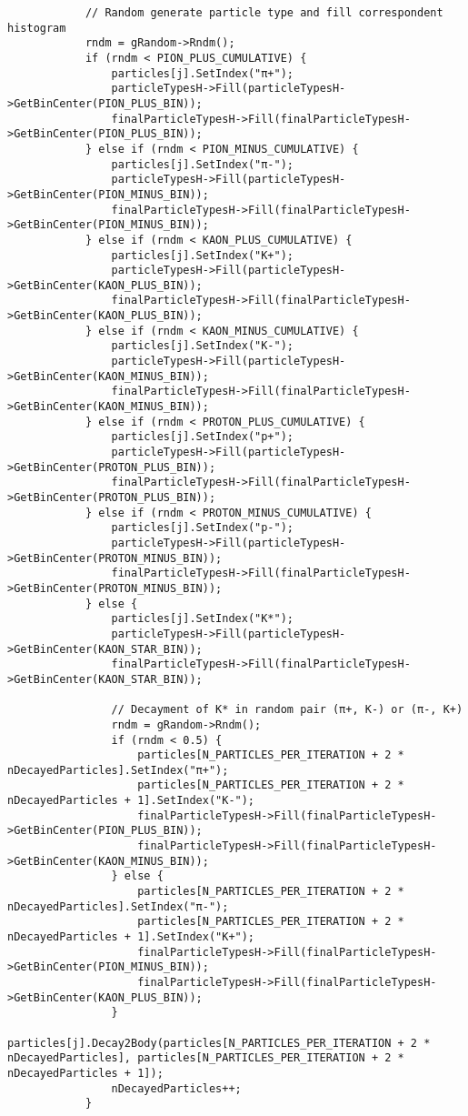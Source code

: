 \documentclass{article}
\begin{document}
\begin{verbatim}
            // Random generate particle type and fill correspondent histogram
            rndm = gRandom->Rndm();
            if (rndm < PION_PLUS_CUMULATIVE) {
                particles[j].SetIndex("π+");
                particleTypesH->Fill(particleTypesH->GetBinCenter(PION_PLUS_BIN));
                finalParticleTypesH->Fill(finalParticleTypesH->GetBinCenter(PION_PLUS_BIN));
            } else if (rndm < PION_MINUS_CUMULATIVE) {
                particles[j].SetIndex("π-");
                particleTypesH->Fill(particleTypesH->GetBinCenter(PION_MINUS_BIN));
                finalParticleTypesH->Fill(finalParticleTypesH->GetBinCenter(PION_MINUS_BIN));
            } else if (rndm < KAON_PLUS_CUMULATIVE) {
                particles[j].SetIndex("K+");
                particleTypesH->Fill(particleTypesH->GetBinCenter(KAON_PLUS_BIN));
                finalParticleTypesH->Fill(finalParticleTypesH->GetBinCenter(KAON_PLUS_BIN));
            } else if (rndm < KAON_MINUS_CUMULATIVE) {
                particles[j].SetIndex("K-");
                particleTypesH->Fill(particleTypesH->GetBinCenter(KAON_MINUS_BIN));
                finalParticleTypesH->Fill(finalParticleTypesH->GetBinCenter(KAON_MINUS_BIN));
            } else if (rndm < PROTON_PLUS_CUMULATIVE) {
                particles[j].SetIndex("p+");
                particleTypesH->Fill(particleTypesH->GetBinCenter(PROTON_PLUS_BIN));
                finalParticleTypesH->Fill(finalParticleTypesH->GetBinCenter(PROTON_PLUS_BIN));
            } else if (rndm < PROTON_MINUS_CUMULATIVE) {
                particles[j].SetIndex("p-");
                particleTypesH->Fill(particleTypesH->GetBinCenter(PROTON_MINUS_BIN));
                finalParticleTypesH->Fill(finalParticleTypesH->GetBinCenter(PROTON_MINUS_BIN));
            } else {
                particles[j].SetIndex("K*");
                particleTypesH->Fill(particleTypesH->GetBinCenter(KAON_STAR_BIN));
                finalParticleTypesH->Fill(finalParticleTypesH->GetBinCenter(KAON_STAR_BIN));

                // Decayment of K* in random pair (π+, K-) or (π-, K+)
                rndm = gRandom->Rndm();
                if (rndm < 0.5) {
                    particles[N_PARTICLES_PER_ITERATION + 2 * nDecayedParticles].SetIndex("π+");
                    particles[N_PARTICLES_PER_ITERATION + 2 * nDecayedParticles + 1].SetIndex("K-");
                    finalParticleTypesH->Fill(finalParticleTypesH->GetBinCenter(PION_PLUS_BIN));
                    finalParticleTypesH->Fill(finalParticleTypesH->GetBinCenter(KAON_MINUS_BIN));
                } else {
                    particles[N_PARTICLES_PER_ITERATION + 2 * nDecayedParticles].SetIndex("π-");
                    particles[N_PARTICLES_PER_ITERATION + 2 * nDecayedParticles + 1].SetIndex("K+");
                    finalParticleTypesH->Fill(finalParticleTypesH->GetBinCenter(PION_MINUS_BIN));
                    finalParticleTypesH->Fill(finalParticleTypesH->GetBinCenter(KAON_PLUS_BIN));
                }
                particles[j].Decay2Body(particles[N_PARTICLES_PER_ITERATION + 2 * nDecayedParticles], particles[N_PARTICLES_PER_ITERATION + 2 * nDecayedParticles + 1]);
                nDecayedParticles++;
            }


\end{verbatim}
\end{document}
